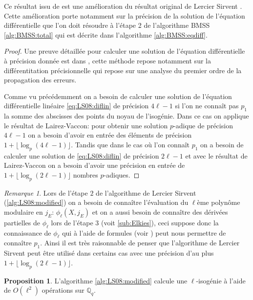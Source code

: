 \documentclass[10pt,a4paper]{book}
\theoremstyle{plain}
\theoremstyle{definition}
\theoremstyle{definition}
\theoremstyle{definition}
\newtheorem{prop}[thm]{Proposition}
\theoremstyle{definition}
\theoremstyle{remark}
\newtheorem{rem}[thm]{Remarque}
\theoremstyle{remark}
\begin{document}
Ce résultat issu de \cite{LairezVaccon16} est une amélioration du résultat original de Lercier Sirvent \cite{Lercier-Sirvent2008}. Cette amélioration porte notamment sur la précision de la solution de l'équation différentielle que l'on doit résoudre à l'étape 2 de l'algorithme BMSS \ref{alg:BMSS:total} qui est décrite dans l'algorithme \ref{alg:BMSS:eqdiff}.

\begin{proof}
Une preuve détaillée pour calculer une solution de l'équation différentielle à précision donnée est dans \cite{LairezVaccon16}, cette méthode repose notamment sur la différentitation précisionnelle qui repose sur une analyse du premier ordre de la propagation des erreurs. 

Comme vu précédemment on a besoin de calculer une solution de l'équation différentielle linéaire \eqref{eq:LS08:diflin} de précision $4\ell-1$ si l'on ne connaît pas $p_1$ la somme des abscisses des points du noyau de l'isogénie. Dans ce cas on applique le résultat de Lairez-Vaccon: pour obtenir une solution $p$-adique de précision $4 \ell-1$ on a besoin d'avoir en entrée des éléments de précision $ 1 + \lfloor \log_p(4 \ell - 1) \rfloor $. Tandis que dans le cas où l'on connaît $p_1$ on a besoin de calculer une solution de \eqref{eq:LS08:diflin} de précision $2\ell - 1$ et avec le résultat de Lairez-Vaccon on a besoin d'avoir une précision en entrée de $ 1 + \lfloor \log_p(2 \ell - 1) \rfloor $ nombres $p$-adiques.
\end{proof}

\begin{rem}
Lors de l'étape $2$ de l'algorithme de  Lercier Sirvent (\ref{alg:LS08:modified}) on a besoin de connaître l'évaluation du $\ell$ème polynôme modulaire en $j_E$: $\phi_{\ell}(X,j_E)$ et on a aussi besoin de connaître des dérivées partielles de $\phi_{\ell}$ lors de l'étape $3$ (voit \ref{sub:Elkies}), ceci suppose donc la connaissance de $\phi_{\ell}$ qui à l'aide de formules (voir \cite[Theoreme 17.22]{ehcc05}) peut nous permettre de connaître $p_1$. Ainsi il est très raisonnable de penser que l'algorithme de Lercier Sirvent peut être utilisé dans certains cas avec une précision d'au plus $1 + \lfloor \log_{p}(2\ell - 1) \rfloor$.
\end{rem}

\begin{prop}
L'algorithme \ref{alg:LS08:modified} calcule une $\ell$-isogénie à l'aide de $O(\ell^2)$  opérations sur $\mathbb{Q}_q$.
\end{prop}
\end{document}
